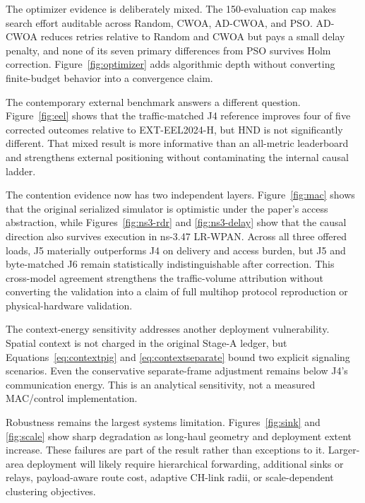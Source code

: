 \documentclass[pdflatex,sn-mathphys-num]{sn-jnl}
\begin{document}
The optimizer evidence is deliberately mixed. The 150-evaluation cap makes search effort auditable across Random, CWOA, AD-CWOA, and PSO. AD-CWOA reduces retries relative to Random and CWOA but pays a small delay penalty, and none of its seven primary differences from PSO survives Holm correction. Figure~\ref{fig:optimizer} adds algorithmic depth without converting finite-budget behavior into a convergence claim.

The contemporary external benchmark answers a different question. Figure~\ref{fig:eel} shows that the traffic-matched J4 reference improves four of five corrected outcomes relative to EXT-EEL2024-H, but HND is not significantly different. That mixed result is more informative than an all-metric leaderboard and strengthens external positioning without contaminating the internal causal ladder.

The contention evidence now has two independent layers. Figure~\ref{fig:mac} shows that the original serialized simulator is optimistic under the paper's access abstraction, while Figures~\ref{fig:ns3-rdr} and \ref{fig:ns3-delay} show that the causal direction also survives execution in ns-3.47 LR-WPAN. Across all three offered loads, J5 materially outperforms J4 on delivery and access burden, but J5 and byte-matched J6 remain statistically indistinguishable after correction. This cross-model agreement strengthens the traffic-volume attribution without converting the validation into a claim of full multihop protocol reproduction or physical-hardware validation.

The context-energy sensitivity addresses another deployment vulnerability. Spatial context is not charged in the original Stage-A ledger, but Equations~\eqref{eq:contextpig} and \eqref{eq:contextseparate} bound two explicit signaling scenarios. Even the conservative separate-frame adjustment remains below J4's communication energy. This is an analytical sensitivity, not a measured MAC/control implementation.

Robustness remains the largest systems limitation. Figures~\ref{fig:sink} and \ref{fig:scale} show sharp degradation as long-haul geometry and deployment extent increase. These failures are part of the result rather than exceptions to it. Larger-area deployment will likely require hierarchical forwarding, additional sinks or relays, payload-aware route cost, adaptive CH-link radii, or scale-dependent clustering objectives.
\end{document}
